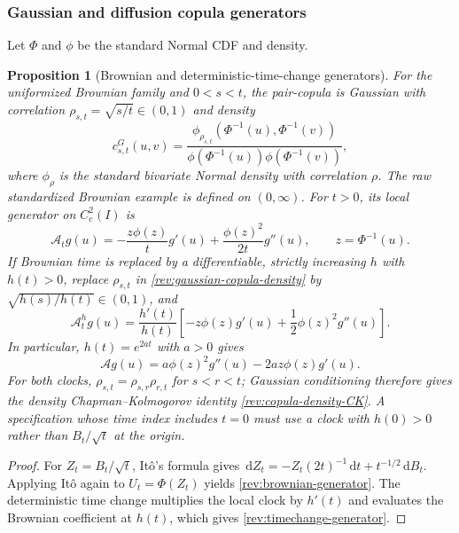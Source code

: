 \documentclass[11pt]{article}
\newtheorem{proposition}[definition]{Proposition}
\theoremstyle{remark}
\newcommand{\dd}{\,\mathrm d}
\begin{document}
\subsubsection{Gaussian and diffusion copula generators}

Let $\Phi$ and $\phi$ be the standard Normal CDF and density.

\begin{proposition}[Brownian and deterministic-time-change generators]
\label{rev:prop-gaussian-generator}
For the uniformized Brownian family and $0<s<t$, the pair-copula is Gaussian
with correlation $\rho_{s,t}=\sqrt{s/t}\in(0,1)$ and density
\begin{equation}
c^{G}_{s,t}(u,v)=
\frac{\phi_{\rho_{s,t}}\!\left(\Phi^{-1}(u),\Phi^{-1}(v)\right)}
     {\phi\!\left(\Phi^{-1}(u)\right)\phi\!\left(\Phi^{-1}(v)\right)},
\label{rev:gaussian-copula-density}
\end{equation}
where $\phi_\rho$ is the standard bivariate Normal density with correlation
$\rho$.  The raw standardized Brownian example is defined on $(0,\infty)$.
For $t>0$, its local generator on $C_c^2(I)$ is
\begin{equation}
\mathcal A_tg(u)=
-\frac{z\phi(z)}{t}g'(u)+\frac{\phi(z)^2}{2t}g''(u),
\qquad z=\Phi^{-1}(u).
\label{rev:brownian-generator}
\end{equation}
If Brownian time is replaced by a differentiable, strictly increasing $h$ with
$h(t)>0$, replace $\rho_{s,t}$ in \eqref{rev:gaussian-copula-density} by
$\sqrt{h(s)/h(t)}\in(0,1)$, and
\begin{equation}
\mathcal A_t^hg(u)=\frac{h'(t)}{h(t)}
\left[-z\phi(z)g'(u)+\frac12\phi(z)^2g''(u)\right].
\label{rev:timechange-generator}
\end{equation}
In particular, $h(t)=e^{2at}$ with $a>0$ gives
\begin{equation}
\mathcal A g(u)=a\phi(z)^2g''(u)-2az\phi(z)g'(u).
\label{rev:stationary-gaussian-generator}
\end{equation}
For both clocks,
$\rho_{s,t}=\rho_{s,r}\rho_{r,t}$ for $s<r<t$; Gaussian conditioning therefore
gives the density Chapman--Kolmogorov identity
\eqref{rev:copula-density-CK}.  A specification whose time index includes
$t=0$ must use a clock with $h(0)>0$ rather than $B_t/\sqrt t$ at the origin.
\end{proposition}

\begin{proof}
For $Z_t=B_t/\sqrt t$, It\^o's formula gives
$\dd Z_t=-Z_t(2t)^{-1}\dd t+t^{-1/2}\dd B_t$.  Applying It\^o again to
$U_t=\Phi(Z_t)$ yields \eqref{rev:brownian-generator}.  The deterministic
time change multiplies the local clock by $h'(t)$ and evaluates the Brownian
coefficient at $h(t)$, which gives \eqref{rev:timechange-generator}.
\end{proof}
\end{document}
